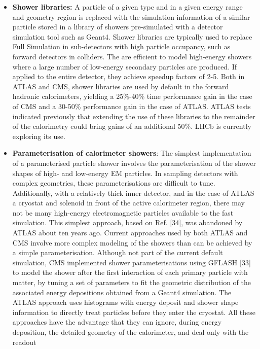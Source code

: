 \documentclass[12pt,a4paper]{article}
\begin{document}
\begin{itemize}
\item
  \textbf{Shower libraries:} A particle of a given type and in a given
  energy range and geometry region is replaced with the simulation
  information of a similar particle stored in a library of showers
  pre-simulated with a detector simulation tool such as Geant4. Shower
  libraries are typically used to replace Full Simulation in
  sub-detectors with high particle occupancy, such as forward detectors
  in colliders. The are efficient to model high-energy showers where a
  large number of low-energy secondary particles are produced. If
  applied to the entire detector, they achieve speedup factors of 2-5.
  Both in ATLAS and CMS, shower libraries are used by default in the
  forward hadronic calorimeters, yielding a 25\%-40\% time performance
  gain in the case of CMS and a 30-50\% performance gain in the case of
  ATLAS. ATLAS tests indicated previously that extending the use of
  these libraries to the remainder of the calorimetry could bring gains
  of an additional 50\%. LHCb is currently exploring its use.
\item
  \textbf{Parameterisation of calorimeter showers}: The simplest
  implementation of a parameterised particle shower involves the
  parameterisation of the shower shapes of high- and low-energy EM
  particles. In sampling detectors with complex geometries, these
  parameterisations are difficult to tune. Additionally, with a
  relatively thick inner detector, and in the case of ATLAS a cryostat
  and solenoid in front of the active calorimeter region, there may not
  be many high-energy electromagnetic particles available to the fast
  simulation. This simplest approach, based on Ref. {[}34{]}, was
  abandoned by ATLAS about ten years ago. Current approaches used by
  both ATLAS and CMS involve more complex modeling of the showers than
  can be achieved by a simple parameterisation. Although not part of the
  current default simulation, CMS implemented shower parameterisations
  using GFLASH {[}33{]} to model the shower after the first interaction
  of each primary particle with matter, by tuning a set of parameters to
  fit the geometric distribution of the associated energy depositions
  obtained from a Geant4 simulation. The ATLAS approach uses histograms
  with energy deposit and shower shape information to directly treat
  particles before they enter the cryostat. All these approaches have
  the advantage that they can ignore, during energy deposition, the
  detailed geometry of the calorimeter, and deal only with the readout

\end{itemize}
\end{document}
